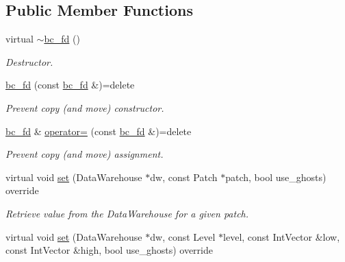 \subsection*{Public Member Functions}
\begin{DoxyCompactItemize}
\item 
virtual \hyperlink{classUintah_1_1PhaseField_1_1detail_1_1bc__fd_3_01ScalarField_3_01T_01_4_00_01STN_00_01VAR_00_01f836207db876ecd28bf65f631f79030f_a24903191d9f896e4c56b0712320a3586}{$\sim$bc\+\_\+fd} ()
\begin{DoxyCompactList}\small\item\em Destructor. \end{DoxyCompactList}\item 
\hyperlink{classUintah_1_1PhaseField_1_1detail_1_1bc__fd_3_01ScalarField_3_01T_01_4_00_01STN_00_01VAR_00_01f836207db876ecd28bf65f631f79030f_a1d243cc9c9da7725af84dc3c76da7583}{bc\+\_\+fd} (const \hyperlink{classUintah_1_1PhaseField_1_1detail_1_1bc__fd}{bc\+\_\+fd} \&)=delete
\begin{DoxyCompactList}\small\item\em Prevent copy (and move) constructor. \end{DoxyCompactList}\item 
\hyperlink{classUintah_1_1PhaseField_1_1detail_1_1bc__fd}{bc\+\_\+fd} \& \hyperlink{classUintah_1_1PhaseField_1_1detail_1_1bc__fd_3_01ScalarField_3_01T_01_4_00_01STN_00_01VAR_00_01f836207db876ecd28bf65f631f79030f_abc4c47d85a1a32312360ad7e539aff36}{operator=} (const \hyperlink{classUintah_1_1PhaseField_1_1detail_1_1bc__fd}{bc\+\_\+fd} \&)=delete
\begin{DoxyCompactList}\small\item\em Prevent copy (and move) assignment. \end{DoxyCompactList}\item 
virtual void \hyperlink{classUintah_1_1PhaseField_1_1detail_1_1bc__fd_3_01ScalarField_3_01T_01_4_00_01STN_00_01VAR_00_01f836207db876ecd28bf65f631f79030f_a8e9206230f471f1e83e57b2d123fa9be}{set} (Data\+Warehouse $\ast$dw, const Patch $\ast$patch, bool use\+\_\+ghosts) override
\begin{DoxyCompactList}\small\item\em Retrieve value from the Data\+Warehouse for a given patch. \end{DoxyCompactList}\item 
virtual void \hyperlink{classUintah_1_1PhaseField_1_1detail_1_1bc__fd_3_01ScalarField_3_01T_01_4_00_01STN_00_01VAR_00_01f836207db876ecd28bf65f631f79030f_a016500469e881e3d9528e2055e499570}{set} (Data\+Warehouse $\ast$dw, const Level $\ast$level, const Int\+Vector \&low, const Int\+Vector \&high, bool use\+\_\+ghosts) override

\end{DoxyCompactItemize}
